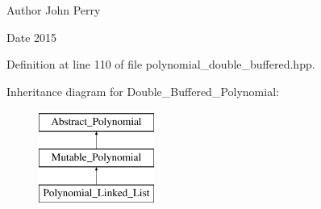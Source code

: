 \begin{DoxyAuthor}{Author}
John Perry 
\end{DoxyAuthor}
\begin{DoxyDate}{Date}
2015 
\end{DoxyDate}


Definition at line 110 of file polynomial\+\_\+double\+\_\+buffered.\+hpp.

Inheritance diagram for Double\+\_\+\+Buffered\+\_\+\+Polynomial\+:\begin{figure}[H]
\begin{center}
\leavevmode
\includegraphics[height=3.000000cm]{group__polygroup}
\end{center}
\end{figure}
